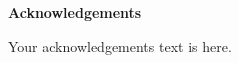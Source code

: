 \clearpage
\thispagestyle{plain}

\vspace*{\fill}
\begin{center}
    \vspace{-4cm} %
    \textbf{Acknowledgements}
  
    \vspace{1.5em} %
    \parbox{0.75\textwidth}
    {%
        Your acknowledgements text is here.
    }
\end{center}
\vspace*{\fill}